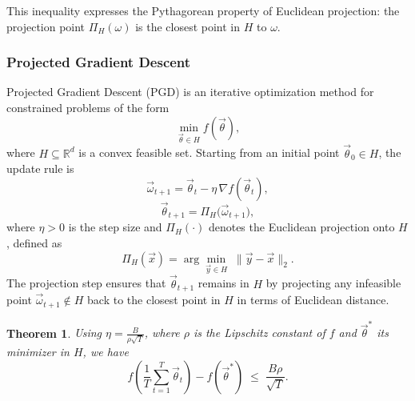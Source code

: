 \documentclass[11pt]{article}
\theoremstyle{plain}
\newtheorem{theorem}{Theorem}
\begin{document}
This inequality expresses the Pythagorean property of Euclidean projection: the projection 
point $\Pi_H(\omega)$ is the closest point in $H$ to $\omega$.

\subsubsection{Projected Gradient Descent}
Projected Gradient Descent (PGD) is an iterative optimization method for constrained problems of the form 
\[
    \min_{\vec{\theta} \in H} f(\vec{\theta}),
\]
where $H \subseteq \mathbb{R}^d$ is a convex feasible set.  
Starting from an initial point $\vec{\theta}_0 \in H$, the update rule is
\[
    \vec{\omega}_{t+1} = \vec{\theta}_t - \eta \, \nabla f(\vec{\theta}_t),
\]
\[
    \vec{\theta}_{t+1} = \Pi_H\big(\vec{\omega}_{t+1}\big),
\]
where $\eta > 0$ is the step size and $\Pi_H(\cdot)$ denotes the Euclidean projection onto $H$, defined as
\[
    \Pi_H(\vec{x}) = \arg\min_{\vec{y} \in H} \; \lVert \vec{y} - \vec{x} \rVert_2.
\]
The projection step ensures that $\vec{\theta}_{t+1}$ remains in $H$ by projecting any infeasible point $\vec{\omega}_{t+1} \notin H$ back to the closest point in $H$ in terms of Euclidean distance.

\begin{theorem}
Using $\eta = \frac{B}{\rho \sqrt{T}}$, where $\rho$ is the Lipschitz constant of $f$ and $\vec{\theta}^*$ its minimizer in $H$, we have
\[
    f\!\left( \frac{1}{T} \sum_{t=1}^T \vec{\theta}_t \right) - f(\vec{\theta}^*) \;\le\; \frac{B\rho}{\sqrt{T}}.
\]
\end{theorem}
\end{document}
